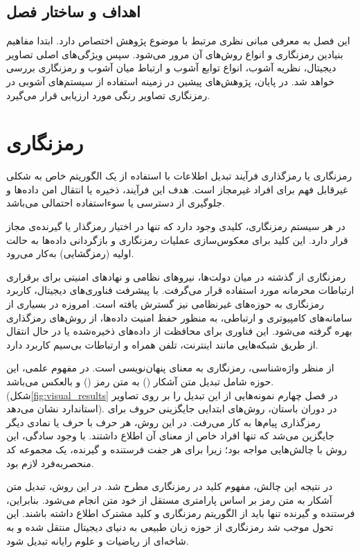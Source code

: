 \subsection{اهداف و ساختار فصل}
این فصل به معرفی مبانی نظری مرتبط با موضوع پژوهش اختصاص دارد. ابتدا مفاهیم بنیادین رمزنگاری و انواع روش‌های آن مرور می‌شود. سپس ویژگی‌های اصلی تصاویر دیجیتال، نظریه آشوب، انواع توابع آشوب و ارتباط میان آشوب و رمزنگاری بررسی خواهد شد. در پایان، پژوهش‌های پیشین در زمینه استفاده از سیستم‌های آشوبی در رمزنگاری تصاویر رنگی مورد ارزیابی قرار می‌گیرد.

\section{رمزنگاری}
رمزنگاری یا رمزگذاری فرآیند تبدیل اطلاعات با استفاده از یک الگوریتم خاص به شکلی غیرقابل فهم برای افراد غیرمجاز است. هدف این فرآیند، ذخیره یا انتقال امن داده‌ها و جلوگیری از دسترسی یا سوءاستفاده احتمالی می‌باشد.

در هر سیستم رمزنگاری، کلیدی وجود دارد که تنها در اختیار رمزگذار یا گیرنده‌ی مجاز قرار دارد. این کلید برای معکوس‌سازی عملیات رمزنگاری و بازگردانی داده‌ها به حالت اولیه (رمزگشایی) به‌کار می‌رود.

رمزنگاری از گذشته در میان دولت‌ها، نیروهای نظامی و نهادهای امنیتی برای برقراری ارتباطات محرمانه مورد استفاده قرار می‌گرفت. با پیشرفت فناوری‌های دیجیتال، کاربرد رمزنگاری به حوزه‌های غیرنظامی نیز گسترش یافته است. امروزه در بسیاری از سامانه‌های کامپیوتری و ارتباطی، به منظور حفظ امنیت داده‌ها، از روش‌های رمزگذاری بهره گرفته می‌شود. این فناوری برای محافظت از داده‌های ذخیره‌شده یا در حال انتقال از طریق شبکه‌هایی مانند اینترنت، تلفن همراه و ارتباطات بی‌سیم کاربرد دارد\cite{ref14}.

از منظر واژه‌شناسی، رمزنگاری به معنای پنهان‌نویسی است. در مفهوم علمی، این حوزه شامل تبدیل متن آشکار () به متن رمز () و بالعکس می‌باشد. (شکل\ref{fig:visual_results} در فصل چهارم نمونه‌هایی از این تبدیل را بر روی تصاویر استاندارد نشان می‌دهد). در دوران باستان، روش‌های ابتدایی جایگزینی حروف برای رمزگذاری پیام‌ها به کار می‌رفت. در این روش، هر حرف با حرف یا نمادی دیگر جایگزین می‌شد که تنها افراد خاص از معنای آن اطلاع داشتند. با وجود سادگی، این روش با چالش‌هایی مواجه بود؛ زیرا برای هر جفت فرستنده و گیرنده، یک مجموعه کد منحصربه‌فرد لازم بود\cite{ref15}.

در نتیجه این چالش، مفهوم کلید در رمزنگاری مطرح شد. در این روش، تبدیل متن آشکار به متن رمز بر اساس پارامتری مستقل از خود متن انجام می‌شود. بنابراین، فرستنده و گیرنده تنها باید از الگوریتم رمزنگاری و کلید مشترک اطلاع داشته باشند. این تحول موجب شد رمزنگاری از حوزه زبان طبیعی به دنیای دیجیتال منتقل شده و به شاخه‌ای از ریاضیات و علوم رایانه تبدیل شود\cite{ref16}.

